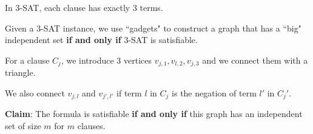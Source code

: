 \documentclass[12pt]{article}
\begin{document}
  In 3-SAT, each clause has exactly 3 terms.

  {
    Given a 3-SAT instance, we use ``gadgets" to construct a graph that has a
    ``big" independent set {\bf if and only if} 3-SAT is satisfiable.

    For a clause $C_j$, we introduce 3 vertices $v_{j, 1}, v_{l, 2}, v_{j, 3}$
    and we connect them with a triangle.

    We also connect $v_{j, l}$ and $v_{j', l'}$ if term $l$ in $C_j$ is the
    negation of term $l'$ in $C_j'$.


    {\bf Claim}: The formula is satisfiable {\bf if and only if} this graph 
    has an independent set of size $m$ for $m$ clauses.
  }
\end{document}

